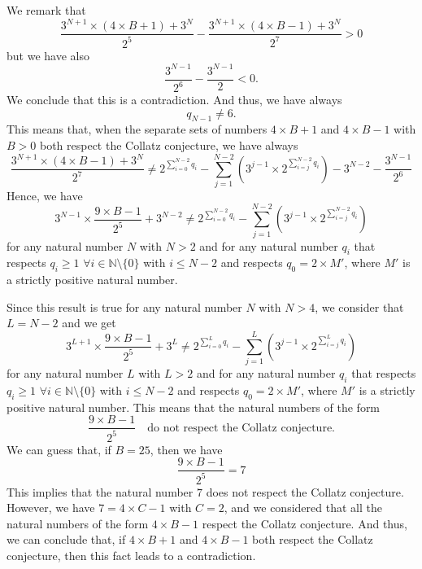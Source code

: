 \documentclass[11pt,a4paper]{article}
\newcommand{\N}{\mathbb{N}}
\theoremstyle{definition}
\begin{document}
We remark that
\begin{equation}
\frac{3^{N+1}\times(4\times B+1)+3^{N}}{2^{5}}-\frac{3^{N+1}\times(4\times B-1)+3^{N}}{2^{7}}>0
\end{equation}
but we have also
\begin{equation}
\frac{3^{N-1}}{2^{6}}-\frac{3^{N-1}}{2}<0.
\end{equation}
We conclude that this is a contradiction. And thus, we have always
\begin{equation}
q_{N-1}\ne 6.
\end{equation}
This means that, when the separate sets of numbers $4\times B+1$ and $4\times B-1$ with $B>0$
both respect the Collatz conjecture, we have always
\begin{equation}
\frac{3^{N+1}\times(4\times B-1)+3^{N}}{2^{7}}\ne 2^{\sum_{i=0}^{N-2}q_i}-\sum_{j=1}^{N-2}\left(3^{j-1}\times 2^{\sum_{i=j}^{N-2}q_i}\right)-3^{N-2}-\frac{3^{N-1}}{2^{6}}
\end{equation}
Hence, we have
\begin{equation}
3^{N-1}\times\frac{9\times B-1}{2^{5}}+3^{N-2}\ne 2^{\sum_{i=0}^{N-2}q_i}-\sum_{j=1}^{N-2}\left(3^{j-1}\times 2^{\sum_{i=j}^{N-2}q_i}\right)
\end{equation}
for any natural number $N$ with $N>2$ and for any natural number $q_i$ that respects
$q_i\ge 1$ $\forall i\in\N\setminus\{0\}$ with $i\le N-2$ and respects $q_0=2\times M'$,
where $M'$ is a strictly positive natural number.

Since this result is true for any natural number $N$ with $N>4$, we consider that $L=N-2$
and we get
\[3^{L+1}\times\frac{9\times B-1}{2^{5}}+3^{L}\ne 2^{\sum_{i=0}^{L}q_i}-\sum_{j=1}^{L}\left(3^{j-1}\times 2^{\sum_{i=j}^{L}q_i}\right)\]
for any natural number $L$ with $L>2$ and for any natural number $q_i$ that respects
$q_i\ge 1$ $\forall i\in\N\setminus\{0\}$ with $i\le N-2$ and respects $q_0=2\times M'$,
where $M'$ is a strictly positive natural number. This means that the natural numbers of the
form
\begin{equation}
\frac{9\times B-1}{2^{5}}\quad\text{do not respect the Collatz conjecture.}
\end{equation}
We can guess that, if $B=25$, then we have
\begin{equation}
\frac{9\times B-1}{2^{5}}=7
\end{equation}
This implies that the natural number $7$ does not respect the Collatz conjecture. However, we
have $7=4\times C-1$ with $C=2$, and we considered that all the natural numbers of the form
$4\times B-1$ respect the Collatz conjecture. And thus, we can conclude that, if
$4\times B+1$ and $4\times B-1$ both respect the Collatz conjecture, then this fact leads to
a contradiction.
\end{document}

